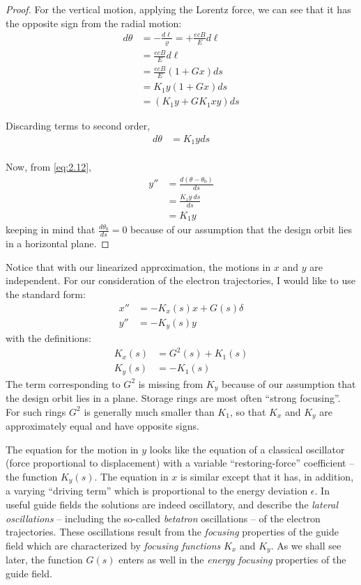 \begin{proof}
	For the vertical motion, applying the Lorentz force, we can see that it has the opposite sign from the radial motion:
	\begin{align*}
		d\theta &= -\frac{d\ell}{\varrho} = + \frac{ecB}{E}d\ell\\
				&= \frac{ecB}{E}d\ell\\
				&= \frac{ecB}{E}(1+Gx)ds\\
				&= K_1 y (1+Gx)ds\\
				& = (K_1 y + GK_1xy)ds
	\end{align*}

	Discarding terms to second order,
	\begin{align*}
		d\theta &= K_1 y ds\\
	\end{align*}

	Now, from \eqref{eq:2.12},
	\begin{align*}
		y'' &= \frac{d(\theta-\theta_0)}{ds}\\
			&= \frac{K_1 y\ ds}{ds}\\
			&= K_1 y
	\end{align*}
	keeping in mind that $\frac{d\theta_0}{ds} = 0$ because of our assumption that the design orbit lies in a horizontal plane.
\end{proof}

Notice that with our linearized approximation, the motions in $x$ and $y$ are independent. For our consideration of the electron trajectories, I would like to use the standard form:
\begin{align}
	x'' &= -K_x(s)x + G(s)\delta\label{eq:2.19}\\
	y'' &= -K_y(s)y\label{eq:2.20}
\end{align}
with the definitions:
\begin{align}
	K_x(s) &= G^2(s)+K_1(s) \label{eq:2.21}\\
	K_y(s) &= -K_1(s) \label{eq:2.22}
\end{align}
The term corresponding to $G^2$ is missing from $K_y$ because of our assumption that
the design orbit lies in a plane. Storage rings are most often ``strong focusing''. For such rings $G^2$ is generally much smaller than $K_1$, so that $K_x$ and $K_y$ are approximately equal and have opposite signs.

The equation for the motion in $y$ looks like the equation of a classical oscillator (force proportional to displacement) with a variable ``restoring-force'' coefficient -- the function $K_y(s)$. The equation in $x$ is similar except that it has, in addition, a varying ``driving term'' which is proportional to the energy deviation $\epsilon$. In useful guide fields the solutions are indeed oscillatory, and describe the \textit{lateral oscillations} -- including the so-called \textit{betatron} oscillations -- of the electron trajectories. These oscillations result from the \textit{focusing} properties of the guide field which are characterized by \textit{focusing functions} $K_x$ and $K_y$. As we shall see later, the function $G(s)$ enters as well in the \textit{energy focusing} properties of the guide field.

